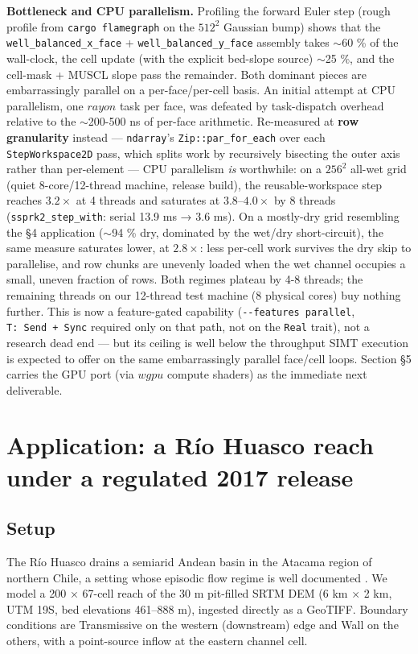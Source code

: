 \textbf{Bottleneck and CPU parallelism.} Profiling the forward Euler
step (rough profile from \texttt{cargo\ flamegraph} on the \(512^{2}\)
Gaussian bump) shows that the \texttt{well\_balanced\_x\_face} +
\texttt{well\_balanced\_y\_face} assembly takes $\sim$60 \% of
the wall-clock, the cell update (with the explicit bed-slope source)
$\sim$25 \%, and the cell-mask + MUSCL slope pass the
remainder. Both dominant pieces are embarrassingly parallel on a
per-face/per-cell basis. An initial attempt at CPU parallelism, one
\(rayon\) task per face, was defeated by task-dispatch overhead relative
to the $\sim$200-500 ns of per-face arithmetic. Re-measured at
\textbf{row granularity} instead --- \texttt{ndarray}'s
\texttt{Zip::par\_for\_each} over each \texttt{StepWorkspace2D} pass,
which splits work by recursively bisecting the outer axis rather than
per-element --- CPU parallelism \emph{is} worthwhile: on a \(256^{2}\)
all-wet grid (quiet 8-core/12-thread machine, release build), the
reusable-workspace step reaches \(3.2×\) at 4 threads and saturates at
\(3.8\)--\(4.0×\) by 8 threads (\texttt{ssprk2\_step\_with}: serial 13.9
ms → 3.6 ms). On a mostly-dry grid resembling the §4 application
($\sim$94 \% dry, dominated by the wet/dry short-circuit), the
same measure saturates lower, at \(2.8×\): less per-cell work survives
the dry skip to parallelise, and row chunks are unevenly loaded when the
wet channel occupies a small, uneven fraction of rows. Both regimes
plateau by 4-8 threads; the remaining threads on our 12-thread test
machine (8 physical cores) buy nothing further. This is now a
feature-gated capability (\texttt{-\/-features\ parallel},
\texttt{T:\ Send\ +\ Sync} required only on that path, not on the
\texttt{Real} trait), not a research dead end --- but its ceiling is
well below the throughput SIMT execution is expected to offer on the
same embarrassingly parallel face/cell loops. Section §5 carries the GPU
port (via \(wgpu\) compute shaders) as the immediate next deliverable.

\section{Application: a Río Huasco reach under a regulated 2017
release}

\subsection{Setup}

The Río Huasco drains a semiarid Andean basin in the Atacama region of
northern Chile, a setting whose episodic flow regime is well documented
\citep{Wilcox2016AtacamaFlash, Cabre2020HuascoENSO}. We model a 200 ×
67-cell reach of the 30 m pit-filled SRTM DEM (6 km × 2 km, UTM 19S, bed
elevations 461--888 m), ingested directly as a GeoTIFF. Boundary
conditions are Transmissive on the western (downstream) edge and Wall on
the others, with a point-source inflow at the eastern channel cell.

